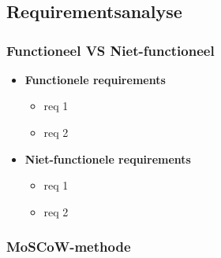 
\chapter{}
\label{ch:methodologie}



\section{Requirementsanalyse}

\subsection{Functioneel VS Niet-functioneel}

\begin{itemize}
    \item \textbf{Functionele requirements}
    \begin{itemize}
        \item req 1
        \item req 2
    \end{itemize}
    \item \textbf{Niet-functionele requirements}
    \begin{itemize}
        \item req 1
        \item req 2
    \end{itemize}
\end{itemize}

\subsection{MoSCoW-methode}

